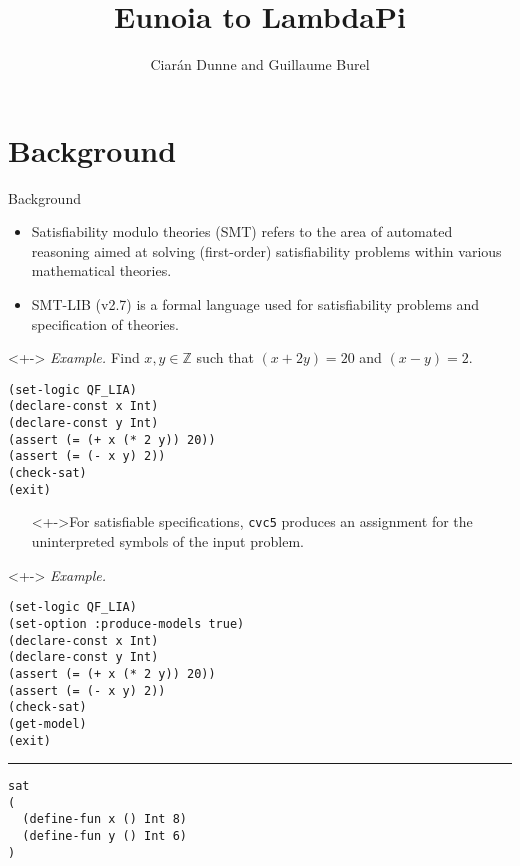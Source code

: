 \documentclass[lualatex, compress, 12pt]{beamer}
\title{Eunoia to LambdaPi}
\author{Ciarán Dunne and Guillaume Burel}
\institute{ENS Paris-Saclay, INRIA}
\newcommand{\exxample}{{\mediumfont\itshape{\textcolor{oc-green-9}{Example.} }}}
\begin{document}
\frame[plain]{\titlepage}

\section{Background}

\begin{frame}[fragile]{Background}
	\begin{itemize}
		\item<+-> \alert{Satisfiability modulo theories} (SMT) refers to the area
		      of automated reasoning aimed at solving (first-order) satisfiability
		      problems within various mathematical theories.
		\item<+-> \alert{SMT-LIB} (v2.7) is a formal language
		      used for satisfiability problems and specification
		      of theories.
	\end{itemize}
	\begin{uncoverenv}<+->
		\exxample
		Find $x,y ∈ ℤ$ such that $(x + 2y) = 20$ and $(x - y) = 2$.
		\begin{lstlisting}
(set-logic QF_LIA)
(declare-const x Int)
(declare-const y Int)
(assert (= (+ x (* 2 y)) 20))
(assert (= (- x y) 2))
(check-sat)
(exit)\end{lstlisting}\end{uncoverenv}
\end{frame}


\begin{frame}[fragile]
	\begin{itemize}
		\item[]<+->{For satisfiable specifications,
		      \texttt{cvc5} produces an \alert{assignment} for the
		      uninterpreted symbols of the input problem.}
	\end{itemize}
	\begin{uncoverenv}<+->
		\exxample
		\begin{lstlisting}
(set-logic QF_LIA)
(set-option :produce-models true)
(declare-const x Int)
(declare-const y Int)
(assert (= (+ x (* 2 y)) 20))
(assert (= (- x y) 2))
(check-sat)
(get-model)
(exit)\end{lstlisting}
		\hrule
		\begin{lstlisting}
sat
(
  (define-fun x () Int 8)
  (define-fun y () Int 6)
)\end{lstlisting}

	\end{uncoverenv}
\end{frame}
\end{document}
